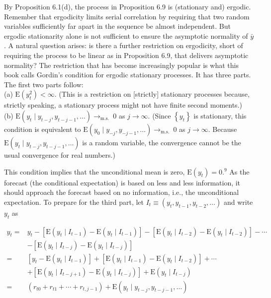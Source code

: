 \documentclass[10pt]{article}
\begin{document}
By Proposition 6.1(d), the process in Proposition 6.9 is (stationary and) ergodic. Remember that ergodicity limits serial correlation by requiring that two random variables sufficiently far apart in the sequence be almost independent. But ergodic stationarity alone is not sufficient to ensure the asymptotic normality of $\bar{y}$. A natural question arises: is there a further restriction on ergodicity, short of requiring the process to be linear as in Proposition 6.9, that delivers asymptotic normality? The restriction that has become increasingly popular is what this book calls Gordin's condition for ergodic stationary processes. It has three parts. The first two parts follow:\\
(a) $\mathrm{E}\left(y_{t}^{2}\right)<\infty$. (This is a restriction on [strictly] stationary processes because, strictly speaking, a stationary process might not have finite second moments.)\\
(b) $\mathrm{E}\left(y_{t} \mid y_{t-j}, y_{t-j-1}, \ldots\right) \rightarrow_{\text {m.s. }} 0$ as $j \rightarrow \infty$. (Since $\left\{y_{t}\right\}$ is stationary, this condition is equivalent to $\mathrm{E}\left(y_{0} \mid y_{-j}, y_{-j-1}, \ldots\right) \rightarrow_{\text {m.s. }} 0$ as $j \rightarrow \infty$. Because $\mathrm{E}\left(y_{t} \mid y_{t-j}, y_{t-j-1}, \ldots\right)$ is a random variable, the convergence cannot be the usual convergence for real numbers.)

This condition implies that the unconditional mean is zero, $\mathrm{E}\left(y_{t}\right)=0 .{ }^{9}$ As the forecast (the conditional expectation) is based on less and less information, it should approach the forecast based on no information, i.e., the unconditional expectation. To prepare for the third part, let $I_{t} \equiv\left(y_{t}, y_{t-1}, y_{t-2}, \ldots\right)$ and write $y_{t}$ as

$$
\begin{aligned}
y_{t}= & y_{t}-\left[\mathrm{E}\left(y_{t} \mid I_{t-1}\right)-\mathrm{E}\left(y_{t} \mid I_{t-1}\right)\right]-\left[\mathrm{E}\left(y_{t} \mid I_{t-2}\right)-\mathrm{E}\left(y_{t} \mid I_{t-2}\right)\right]-\cdots \\
& -\left[\mathrm{E}\left(y_{t} \mid I_{t-j}\right)-\mathrm{E}\left(y_{t} \mid I_{t-j}\right)\right] \\
= & {\left[y_{t}-\mathrm{E}\left(y_{t} \mid I_{t-1}\right)\right]+\left[\mathrm{E}\left(y_{t} \mid I_{t-1}\right)-\mathrm{E}\left(y_{t} \mid I_{t-2}\right)\right]+\cdots } \\
& +\left[\mathrm{E}\left(y_{t} \mid I_{t-j+1}\right)-\mathrm{E}\left(y_{t} \mid I_{t-j}\right)\right]+\mathrm{E}\left(y_{t} \mid I_{t-j}\right) \\
= & \left(r_{t 0}+r_{t 1}+\cdots+r_{t, j-1}\right)+\mathrm{E}\left(y_{t} \mid y_{t-j}, y_{t-j-1}, \ldots\right)
\end{aligned}
$$
\end{document}
